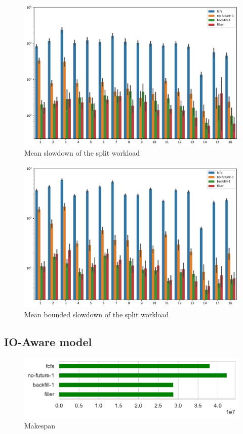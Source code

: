 \documentclass[thesis-en.tex]{subfiles}
\begin{document}
\begin{figure}[p]
    \centering
    \includegraphics[width=\textwidth]{reservation_alloc-only_parts_slowdown.pdf}
    \caption{Mean slowdown of the split workload}
    \label{fig:reservation_alloc-only_parts_slowdown}
\end{figure}

\begin{figure}[p]
    \centering
    \includegraphics[width=\textwidth]{reservation_alloc-only_parts_bounded-slowdown.pdf}
    \caption{Mean bounded slowdown of the split workload}
    \label{fig:reservation_alloc-only_parts_bounded-slowdown}
\end{figure}

\FloatBarrier

\subsection{IO-Aware model}
\begin{figure}[hp]
    \centering
    \includegraphics[width=\textwidth]{reservation_io-aware_makespan.pdf}
    \caption{Makespan}
    \label{fig:reservation_io-aware_makespan}
\end{figure}
\end{document}
